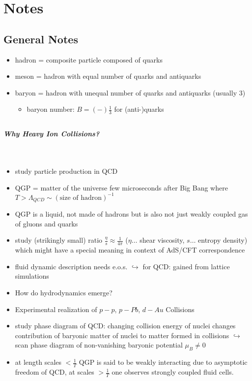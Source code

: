 \chapter{Notes}

\section{General Notes}

\begin{itemize}
    \item hadron = composite particle composed of quarks
    \item meson = hadron with equal number of quarks and antiquarks
    \item baryon = hadron with unequal number of quarks and antiquarks (usually 3)
          \begin{itemize}
              \item baryon number: $B=(-)\frac{1}{3}$ for (anti-)quarks
          \end{itemize}
\end{itemize}

\section{\cite{BuszaEtAl_2018}}


\paragraph*{Why Heavy Ion Collisions?}\mbox{}\\
\begin{itemize}
    \item study particle production in QCD
    \item QGP = matter of the universe few microseconds after Big Bang where $T>\Lambda_{QCD}\sim(\text{size of hadron})^{-1}$
    \item QGP is a liquid, not made of hadrons but is also not just weakly coupled gas of gluons and quarks
    \item study (strikingly small) ratio $\frac{\eta}{s}\approx\frac{1}{4\pi}$ ($\eta\dots$ shear viscosity, $s\dots$ entropy density) which might have a special meaning in context of AdS/CFT correspondence
    \item fluid dynamic description needs e.o.s. $\hookrightarrow$ for QCD: gained from lattice simulations
    \item How do hydrodynamics emerge?
    \item Experimental realization of $p-p$, $p-Pb$, $d-Au$ Collisions
    \item study phase diagram of QCD: changing collision energy of nuclei changes contribution of baryonic matter of nuclei to matter formed in collisions $\hookrightarrow$ scan phase diagram of non-vanishing baryonic potential $\mu_B\neq 0$
    \item at length scales $<\frac{1}{T}$ QGP is said to be weakly interacting due to asymptotic freedom of QCD, at scales $>\frac{1}{T}$ one observes strongly coupled fluid cells. 
\end{itemize}


